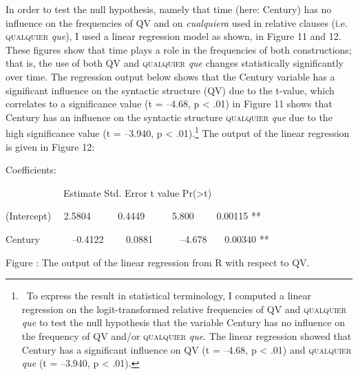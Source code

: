 \begin{styleStandard}
In order to test the null hypothesis, namely that time (here: Century) has no influence on the frequencies of QV and on \textit{cualquiera} used in relative clauses (i.e. \textsc{qualquier}\textit{ que}), I used a linear regression model as shown, in Figure 11 and 12. These figures show that time plays a role in the frequencies of both constructions; that is, the use of both QV and \textsc{qualquier}\textit{ que} changes statistically significantly over time. The regression output below shows that the Century variable has a significant influence on the syntactic structure (QV) due to the t-value, which correlates to a significance value (t = –4.68, p {\textless} .01) in Figure 11 shows that Century has an influence on the syntactic structure \textsc{qualquier}\textit{ que} due to the high significance value (t = –3.940, p {\textless} .01).\footnote{\textrm{\ To express the result in statistical terminology, I computed a linear regression on the logit-transformed relative frequencies of QV and }\textsc{qualquier}\textrm{\textit{ que}}\textrm{ to test the null hypothesis that the variable Century has no influence on the frequency of QV and/or }\textsc{qualquier }\textrm{\textit{que}}\textrm{. The linear regression showed that Century has a significant influence on QV (t = –4.68, p {\textless} .01) and }\textsc{qualquier}\textrm{ }\textrm{\textit{que}}\textrm{ (t = –3.940, p {\textless} .01).}} The output of the linear regression is given in Figure 12:
\end{styleStandard}

\begin{styleStandard}
Coefficients:
\end{styleStandard}

\begin{styleStandard}
\ \ \ \ \ \ \ \ \ \ \ \ Estimate Std. Error t value Pr({\textgreater}{\textbar}t{\textbar}) \ \ 
\end{styleStandard}

\begin{styleStandard}
(Intercept) \ \ 2.5804 \ \ \ \ \ 0.4449 \ \ \ \ \ 5.800 \ \ \ \ 0.00115 **
\end{styleStandard}

\begin{styleStandard}
Century \ \ \ \ \ \ –0.4122~~~~ 0.0881~ \ \ \ \ –4.678~ \ \ 0.00340 **
\end{styleStandard}

\begin{styleStandard}
Figure : The output of the linear regression from R with respect to QV.
\end{styleStandard}

